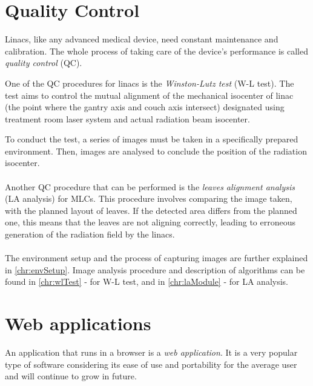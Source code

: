 \section{Quality Control}

Linacs, like any advanced medical device, need constant maintenance and calibration. The whole process of taking care of the device's performance is called \emph{quality control} (QC).

One of the QC procedures for linacs is the \emph{Winston-Lutz test} (W-L test). The test aims to control the mutual alignment of the mechanical isocenter of linac (the point where the gantry axis and couch axis intersect) designated using treatment room laser system and actual radiation beam isocenter.

To conduct the test, a series of images must be taken in a specifically prepared environment. Then, images are analysed to conclude the position of the radiation isocenter. \cite{wl_og} \cite{wl_2}


\paragraph{}
Another QC procedure that can be performed is the \emph{leaves alignment analysis} (LA analysis) for MLCs. This procedure involves comparing the image taken, with the planned layout of leaves. If the detected area differs from the planned one, this means that the leaves are not aligning correctly, leading to erroneous generation of the radiation field by the linacs.

\paragraph{}
The environment setup and the process of capturing images are further explained in \autoref{chr:envSetup}. Image analysis procedure and description of algorithms can be found in \autoref{chr:wlTest} - for W-L test, and in \autoref{chr:laModule} - for LA analysis.

\section{Web applications}

An application that runs in a browser is a \emph{web application}. It is a very popular type of software considering its ease of use and portability for the average user and will continue to grow in future. \cite{future_of_web_apps_2024}


